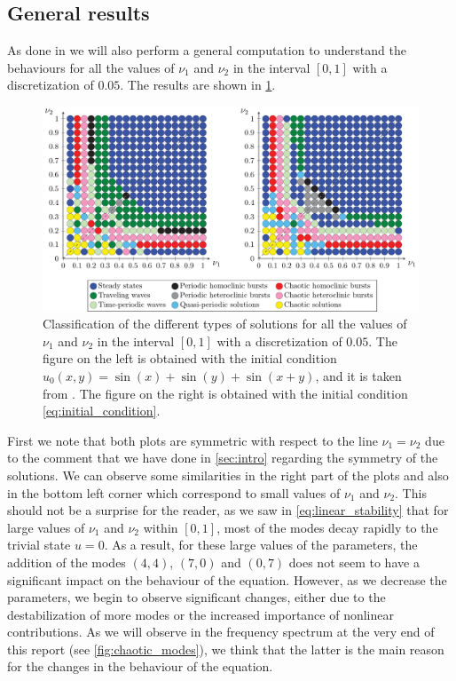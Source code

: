 \documentclass[twoside]{article}
\begin{document}
\subsection{General results}\label{sec:general_results}
As done in \cite{Kalogirou2015} we will also perform a general computation to understand the behaviours for all the values of $\nu_1$ and $\nu_2$ in the interval $[0,1]$ with a discretization of $0.05$. The results are shown in \cref{fig:classification_nu1_nu2}.

\begin{figure}[ht]
  \centering
  \includegraphics[width=\textwidth]{images/nu1-nu2.pdf}
  \caption{Classification of the different types of solutions for all the values of $\nu_1$ and $\nu_2$ in the interval $[0,1]$ with a discretization of $0.05$. The figure on the left is obtained with the initial condition $u_0(x,y) = \sin(x) + \sin(y) + \sin(x+y)$, and it is taken from \cite{Kalogirou2015}. The figure on the right is obtained with the initial condition \cref{eq:initial_condition}.}
  \label{fig:classification_nu1_nu2}
\end{figure}

First we note that both plots are symmetric with respect to the line $\nu_1=\nu_2$ due to the comment that we have done in \cref{sec:intro} regarding the symmetry of the solutions. We can observe some similarities in the right part of the plots and also in the bottom left corner which correspond to small values of $\nu_1$ and $\nu_2$. This should not be a surprise for the reader, as we saw in \cref{eq:linear_stability} that for large values of $\nu_1$ and $\nu_2$ within $[0,1]$, most of the modes decay rapidly to the trivial state $u=0$. As a result, for these large values of the parameters, the addition of the modes $(4,4)$, $(7,0)$ and $(0,7)$ does not seem to have a significant impact on the behaviour of the equation. However, as we decrease the parameters, we begin to observe significant changes, either due to the destabilization of more modes or the increased importance of nonlinear contributions. As we will observe in the frequency spectrum at the very end of this report (see \cref{fig:chaotic_modes}), we think that the latter is the main reason for the changes in the behaviour of the equation.
\end{document}
